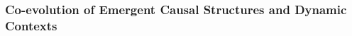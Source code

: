 \subsubsection{Co-evolution of Emergent Causal Structures and Dynamic Contexts}
\label{subsubsec:emergent_coevolution_context_causality}




